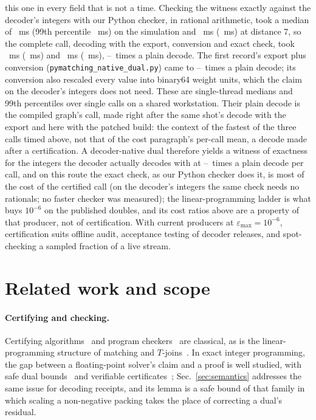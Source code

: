 \documentclass[aps,pra,twocolumn,superscriptaddress,nofootinbib,longbibliography,floatfix]{revtex4-2}
\newcommand{\eps}{\varepsilon}
\newcommand{\T}{T}
\begin{document}
this one in every field that is not a time. Checking the witness exactly against the decoder's integers with our Python checker, in rational arithmetic, took a median of \NdSimIntCheckMs~ms (99th percentile \NdSimIntCheckPNinetyNineMs~ms) on the simulation and \NdWSevenIntCheckMs~ms (\NdWSevenIntCheckPNinetyNineMs~ms) at distance 7, so the complete call, decoding with the export, conversion and exact check, took \NdSimCompleteMs~ms (\NdSimCompletePNinetyNineMs~ms) and \NdWSevenCompleteMs~ms (\NdWSevenCompletePNinetyNineMs~ms), \NdCompleteRatioLo--\NdCompleteRatioHi\ times a plain decode. The first record's export plus conversion (\nolinkurl{pymatching_native_dual.py}) came to \NdRescaleRatioLo--\NdRescaleRatioHi\ times a plain decode; its conversion also rescaled every value into binary64 weight units, which the claim on the decoder's integers does not need. These are single-thread medians and 99th percentiles over single calls on a shared workstation. Their plain decode is the compiled graph's call, made right after the same shot's decode with the export and here with the patched build: the context of the fastest of the three calls timed above, not that of the cost paragraph's per-call mean, a decode made after a certification. A decoder-native dual therefore yields a witness of exactness for the integers the decoder actually decodes with at \NdCallRatioLo--\NdCallRatioHi\ times a plain decode per call, and on this route the exact check, as our Python checker does it, is most of the cost of the certified call (on the decoder's integers the same check needs no rationals; no faster checker was measured); the linear-programming ladder is what buys $10^{-6}$ on the published doubles, and its cost ratios above are a property of that producer, not of certification. With current producers at $\eps_{\max}=10^{-6}$, certification suits offline audit, acceptance testing of decoder releases, and spot-checking a sampled fraction of a live stream.

\section{Related work and scope}
\label{sec:related}

\paragraph*{Certifying and checking.} Certifying algorithms~\cite{mcconnell2011certifying} and program checkers~\cite{blumkannan1995} are classical, as is the linear-programming structure of matching and $\T$-joins~\cite{edmonds1965polyhedron,edmondsjohnson1973}. In exact integer programming, the gap between a floating-point solver's claim and a proof is well studied, with safe dual bounds~\cite{neumaier2004safe,steffy2013valid} and verifiable certificates~\cite{cheung2017verifying,eifler2023computational}; Sec.~\ref{sec:semantics} addresses the same issue for decoding receipts, and its lemma is a safe bound of that family in which scaling a non-negative packing takes the place of correcting a dual's residual.
\end{document}

